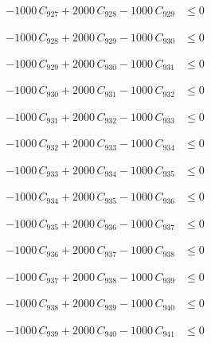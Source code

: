 \documentclass[a4paper,11pt]{article}
\begin{document}
\begin{align}
-1000\,C_{927} + 2000\,C_{928} - 1000\,C_{929} &\leq 0 \nonumber
\end{align}

\begin{align}
-1000\,C_{928} + 2000\,C_{929} - 1000\,C_{930} &\leq 0 \nonumber
\end{align}

\begin{align}
-1000\,C_{929} + 2000\,C_{930} - 1000\,C_{931} &\leq 0 \nonumber
\end{align}

\begin{align}
-1000\,C_{930} + 2000\,C_{931} - 1000\,C_{932} &\leq 0 \nonumber
\end{align}

\begin{align}
-1000\,C_{931} + 2000\,C_{932} - 1000\,C_{933} &\leq 0 \nonumber
\end{align}

\begin{align}
-1000\,C_{932} + 2000\,C_{933} - 1000\,C_{934} &\leq 0 \nonumber
\end{align}

\begin{align}
-1000\,C_{933} + 2000\,C_{934} - 1000\,C_{935} &\leq 0 \nonumber
\end{align}

\begin{align}
-1000\,C_{934} + 2000\,C_{935} - 1000\,C_{936} &\leq 0 \nonumber
\end{align}

\begin{align}
-1000\,C_{935} + 2000\,C_{936} - 1000\,C_{937} &\leq 0 \nonumber
\end{align}

\begin{align}
-1000\,C_{936} + 2000\,C_{937} - 1000\,C_{938} &\leq 0 \nonumber
\end{align}

\begin{align}
-1000\,C_{937} + 2000\,C_{938} - 1000\,C_{939} &\leq 0 \nonumber
\end{align}

\begin{align}
-1000\,C_{938} + 2000\,C_{939} - 1000\,C_{940} &\leq 0 \nonumber
\end{align}

\begin{align}
-1000\,C_{939} + 2000\,C_{940} - 1000\,C_{941} &\leq 0 \nonumber
\end{align}
\end{document}
